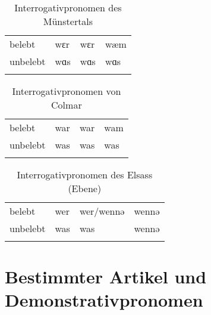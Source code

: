 
\begin{table}[H]
	\caption{Interrogativpronomen des Münstertals \citep[48]{Mankel1886}}\label{table78}
	\begin{tabular}{llll}
		\lsptoprule
		& \NOM & \AKK & \DAT\\\midrule
 belebt & wɛr & wɛr & wæm\\
		unbelebt & wɑs & wɑs & wɑs\\
		\lspbottomrule
	\end{tabular}
\end{table}


\begin{table}[H]
	\caption{Interrogativpronomen von Colmar \citep[85-86]{Henry1900}}\label{table79}
	\begin{tabular}{llll}
		\lsptoprule
		& \NOM & \AKK & \DAT\\\midrule
 belebt & war & war & wam\\
		unbelebt & was & was & was\\
		\lspbottomrule
	\end{tabular}
\end{table}


\begin{table}[H]
	\caption{Interrogativpronomen des Elsass (Ebene) \citep[164-167]{Beyer1963}}\label{table80}
	\begin{tabular}{llll}
		\lsptoprule
		& \NOM & \AKK & \DAT\\\midrule
 belebt & wer & wer/wennə & wennə\\
		unbelebt & was & was & wennə\\
		\lspbottomrule
	\end{tabular}
\end{table}

\section{Bestimmter Artikel und Demonstrativpronomen}


